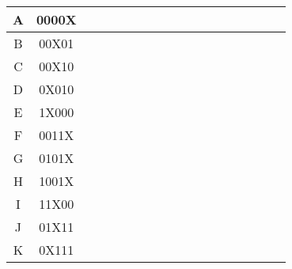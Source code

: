 \documentclass{article}
\begin{document}
\begin{flushleft}
\begin{tabular}{|c|c|r*{15}{|c}|}
    A & 0000X&&&\makecell{ }&\makecell{ }&\makecell{ }&\makecell{ }&\makecell{ }&\makecell{ }&\makecell{ }&\makecell{ }&\makecell{ }&\makecell{ }&\makecell{ }&\makecell{ }&\makecell{ }\\ \hline
    B & 00X01&\makecell{ }&&\makecell{ }&&\makecell{ }&\makecell{ }&\makecell{ }&\makecell{ }&\makecell{ }&\makecell{ }&\makecell{ }&\makecell{ }&\makecell{ }&\makecell{ }&\makecell{ }\\ \hline
    C & 00X10&\makecell{ }&\makecell{ }&&\makecell{ }&&\makecell{ }&\makecell{ }&\makecell{ }&\makecell{ }&\makecell{ }&\makecell{ }&\makecell{ }&\makecell{ }&\makecell{ }&\makecell{ }\\ \hline
    D & 0X010&\makecell{ }&\makecell{ }&&\makecell{ }&\makecell{ }&\makecell{ }&&\makecell{ }&\makecell{ }&\makecell{ }&\makecell{ }&\makecell{ }&\makecell{ }&\makecell{ }&\makecell{ }\\ \hline
    E & 1X000&\makecell{ }&\makecell{ }&\makecell{ }&\makecell{ }&\makecell{ }&\makecell{ }&\makecell{ }&\makecell{ }&\makecell{ }&\makecell{ }&\makecell{ }&\makecell{ }&&\makecell{ }&\makecell{ }\\ \hline
    F & 0011X&\makecell{ }&\makecell{ }&\makecell{ }&\makecell{ }&&&\makecell{ }&\makecell{ }&\makecell{ }&\makecell{ }&\makecell{ }&\makecell{ }&\makecell{ }&\makecell{ }&\makecell{ }\\ \hline
    G & 0101X&\makecell{ }&\makecell{ }&\makecell{ }&\makecell{ }&\makecell{ }&\makecell{ }&&&\makecell{ }&\makecell{ }&\makecell{ }&\makecell{ }&\makecell{ }&\makecell{ }&\makecell{ }\\ \hline
    H & 1001X&\makecell{ }&\makecell{ }&\makecell{ }&\makecell{ }&\makecell{ }&\makecell{ }&\makecell{ }&\makecell{ }&\makecell{ }&&&\makecell{ }&\makecell{ }&\makecell{ }&\makecell{ }\\ \hline
    I & 11X00&\makecell{ }&\makecell{ }&\makecell{ }&\makecell{ }&\makecell{ }&\makecell{ }&\makecell{ }&\makecell{ }&\makecell{ }&\makecell{ }&\makecell{ }&\makecell{ }&&&\makecell{ }\\ \hline
    J & 01X11&\makecell{ }&\makecell{ }&\makecell{ }&\makecell{ }&\makecell{ }&\makecell{ }&\makecell{ }&&&\makecell{ }&\makecell{ }&\makecell{ }&\makecell{ }&\makecell{ }&\makecell{ }\\ \hline
    K & 0X111&\makecell{ }&\makecell{ }&\makecell{ }&\makecell{ }&\makecell{ }&&\makecell{ }&\makecell{ }&&\makecell{ }&\makecell{ }&\makecell{ }&\makecell{ }&\makecell{ }&\makecell{ }\\ \hline

\end{tabular}
\end{flushleft}
\end{document}
